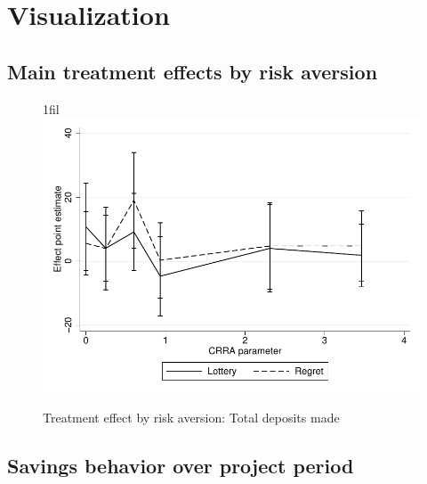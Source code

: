 \documentclass[11pt]{article}
\makeatletter
\newcommand*{\centerfloat}{%
  \parindent \z@
  \leftskip \z@ \@plus 1fil \@minus \textwidth
  \rightskip\leftskip
  \parfillskip \z@skip}
\makeatother
\begin{document}
        
        

    \clearpage

\section{Visualization}

	\subsection{Main treatment effects by risk aversion}

		\begin{figure}[h]
		\centering
		\caption{Treatment effect by risk aversion: Total deposits made}
		\centerfloat
		\includegraphics[width=\textwidth]{../../figures/line-mobile_totdepositsbyrisk.pdf}
		\end{figure}

	\clearpage

	\subsection{Savings behavior over project period}
\end{document}

